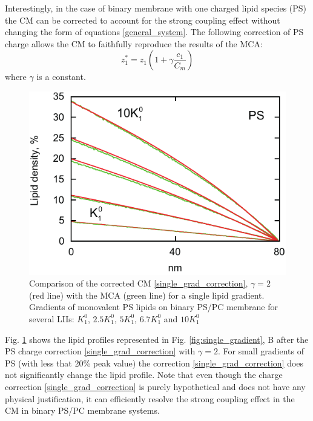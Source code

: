 Interestingly, in the case of binary membrane with one charged lipid species (PS) the CM can be corrected to account for the strong coupling effect without changing the form of equations \eqref{general_system}. The following correction of PS charge allows the CM to faithfully reproduce the results of the MCA:
\begin{equation}
\label{single_grad_correction}
 z_1^*=z_1(1+\gamma\frac{c_1}{C_m})
\end{equation}
where $\gamma$ is a constant.

\begin{figure}[!ht]
\centering
  \includegraphics[scale=1.03]{../figures/single_grad_values_correction_half_lattice.pdf}

\caption[Comparison of the corrected CM with MCA for a single lipid gradient]{Comparison of the corrected CM \eqref{single_grad_correction}, $\gamma = 2$ (red line) with the MCA (green line) for a single lipid gradient. Gradients of monovalent PS lipids on binary PS/PC membrane for several LIIs: $K_1^0$, $2.5 K_1^0$, $5 K_1^0$, $6.7 K_1^0$ and $10 K_1^0$}
\label{fig:single_gradient_corrected}
\end{figure}

Fig. \ref{fig:single_gradient_corrected} shows the lipid profiles represented in Fig. \ref{fig:single_gradient}, B after the PS charge correction \eqref{single_grad_correction} with $\gamma=2$. For small gradients of PS (with less that 20\% peak value) the correction \eqref{single_grad_correction} does not significantly change the lipid profile. Note that even though the charge correction \eqref{single_grad_correction} is purely hypothetical and does not have any physical justification, it can efficiently resolve the strong coupling effect in the CM in binary PS/PC membrane systems.

